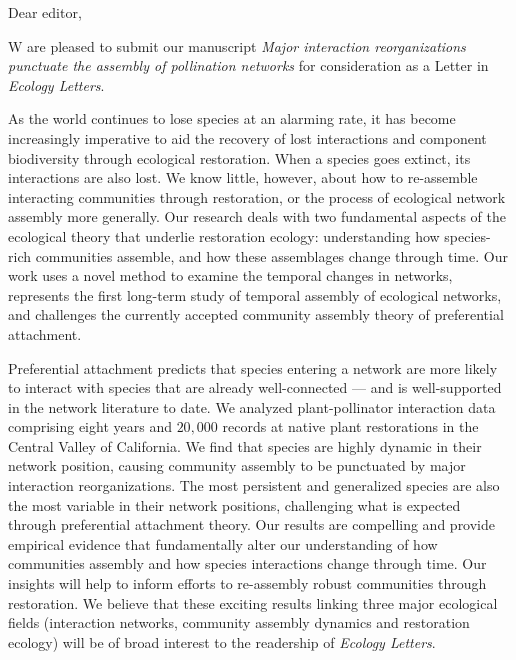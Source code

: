 \documentclass[12pt]{letter}
\begin{document}
\begin{letter}{}

  \opening{Dear editor,}

  W are pleased to submit our manuscript \textit{Major interaction
    reorganizations punctuate the assembly of pollination networks}
  for consideration as a Letter in \textit{Ecology Letters}.

  As the world continues to lose species at an alarming rate, it has
  become increasingly imperative to aid the recovery of lost
  interactions and component biodiversity through ecological
  restoration. When a species goes extinct, its interactions are also
  lost. We know little, however, about how to re-assemble interacting
  communities through restoration, or the process of ecological
  network assembly more generally. Our research deals with two
  fundamental aspects of the ecological theory that underlie
  restoration ecology: understanding how species-rich communities
  assemble, and how these assemblages change through time. Our work
  uses a novel method to examine the temporal changes in networks,
  represents the first long-term study of temporal assembly of
  ecological networks, and challenges the currently accepted community
  assembly theory of preferential attachment.

  Preferential attachment predicts that species entering a network are
  more likely to interact with species that are already well-connected
  --- and is well-supported in the network literature to date.  We
  analyzed plant-pollinator interaction data comprising eight years
  and \texttildelow $20,000$ records at native plant restorations in
  the Central Valley of California. We find that species are highly
  dynamic in their network position, causing community assembly to be
  punctuated by major interaction reorganizations. The most persistent
  and generalized species are also the most variable in their network
  positions, challenging what is expected through preferential
  attachment theory. Our results are compelling and provide empirical
  evidence that fundamentally alter our understanding of how
  communities assembly and how species interactions change through
  time. Our insights will help to inform efforts to re-assembly robust
  communities through restoration.  We believe that these exciting
  results linking three major ecological fields (interaction networks,
  community assembly dynamics and restoration ecology) will be of
  broad interest to the readership of \textit{Ecology Letters}.



\end{letter}
\end{document}
